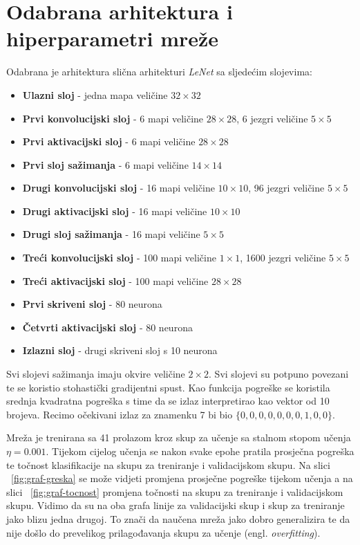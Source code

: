 \documentclass[times, utf8, zavrsni, numeric]{fer}
\begin{document}
\section{Odabrana arhitektura i hiperparametri mreže}
Odabrana je arhitektura slična arhitekturi \textit{LeNet} \citep{lecun1995convolutional} sa sljedećim slojevima:
\begin{itemize}
\item \textbf{Ulazni sloj} - jedna mapa veličine $32 \times 32$
\item \textbf{Prvi konvolucijski sloj} - 6 mapi veličine $28 \times 28$, 6 jezgri veličine $5 \times 5$
\item \textbf{Prvi aktivacijski sloj} - 6 mapi veličine $28 \times 28$
\item \textbf{Prvi sloj sažimanja} - 6 mapi veličine $14 \times 14$
\item \textbf{Drugi konvolucijski sloj} - 16 mapi veličine $10 \times 10$, 96 jezgri veličine $5 \times 5$
\item \textbf{Drugi aktivacijski sloj} - 16 mapi veličine $10 \times 10$
\item \textbf{Drugi sloj sažimanja} - 16 mapi veličine $5 \times 5$
\item \textbf{Treći konvolucijski sloj} - 100 mapi veličine $1 \times 1$, 1600 jezgri veličine $5 \times 5$
\item \textbf{Treći aktivacijski sloj} - 100 mapi veličine $28 \times 28$
\item \textbf{Prvi skriveni sloj} - 80 neurona
\item \textbf{Četvrti aktivacijski sloj} - 80 neurona
\item \textbf{Izlazni sloj} - drugi skriveni sloj s 10 neurona
\end{itemize}

Svi slojevi sažimanja imaju okvire veličine $2 \times 2$. Svi slojevi su potpuno povezani te se koristio stohastički gradijentni spust. Kao funkcija pogreške se koristila srednja kvadratna pogreška s time da se izlaz interpretirao kao vektor od 10 brojeva. Recimo očekivani izlaz za znamenku 7 bi bio $\{0,0,0,0,0,0,0,1,0,0\}$.

Mreža je trenirana sa 41 prolazom kroz skup za učenje sa stalnom stopom učenja $\eta=0.001$. Tijekom cijelog učenja se nakon svake epohe pratila prosječna pogreška te točnost klasifikacije na skupu za treniranje i validacijskom skupu. Na slici ~\ref{fig:graf-greska} se može vidjeti promjena prosječne pogreške tijekom učenja a na slici ~\ref{fig:graf-tocnost} promjena točnosti na skupu za treniranje i validacijskom skupu. Vidimo da su na oba grafa linije za validacijski skup i skup za treniranje jako blizu jedna drugoj. To znači da naučena mreža jako dobro generalizira te da nije došlo do prevelikog prilagođavanja skupu za učenje (engl. \textit{overfitting}).
\end{document}
